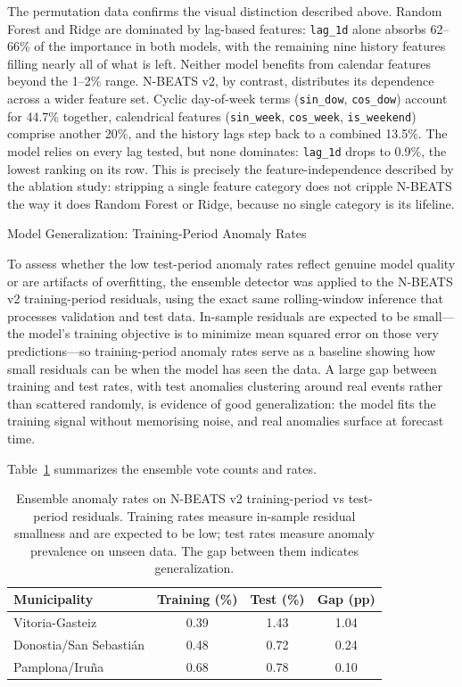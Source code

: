 ﻿\documentclass[12pt,reqno, twoside]{amsbook}
\makeatletter
\numberwithin{figure}{chapter}
\numberwithin{table}{chapter}
\numberwithin{equation}{chapter}
\def\subsection{\@startsection{subsection}{2}%
      \z@{.5\linespacing\@plus.7\linespacing}{.25\linespacing}%
      {\normalfont\bfseries\flushleft}}
\theoremstyle{plain}
\numberwithin{equation}{chapter}
\numberwithin{section}{chapter}
\makeatother
\begin{document}
The permutation data confirms the visual distinction described above. Random Forest and Ridge are dominated by lag-based features: \texttt{lag\_1d} alone absorbs 62--66\% of the importance in both models, with the remaining nine history features filling nearly all of what is left. Neither model benefits from calendar features beyond the 1--2\% range. N-BEATS v2, by contrast, distributes its dependence across a wider feature set. Cyclic day-of-week terms (\texttt{sin\_dow}, \texttt{cos\_dow}) account for 44.7\% together, calendrical features (\texttt{sin\_week}, \texttt{cos\_week}, \texttt{is\_weekend}) comprise another 20\%, and the history lags step back to a combined 13.5\%. The model relies on every lag tested, but none dominates: \texttt{lag\_1d} drops to 0.9\%, the lowest ranking on its row. This is precisely the feature-independence described by the ablation study: stripping a single feature category does not cripple N-BEATS the way it does Random Forest or Ridge, because no single category is its lifeline.

\subsection{Model Generalization: Training-Period Anomaly Rates}

To assess whether the low test-period anomaly rates reflect genuine model quality or are artifacts of overfitting, the ensemble detector was applied to the N-BEATS v2 training-period residuals, using the exact same rolling-window inference that processes validation and test data. In-sample residuals are expected to be small---the model's training objective is to minimize mean squared error on those very predictions---so training-period anomaly rates serve as a baseline showing how small residuals can be when the model has seen the data. A large gap between training and test rates, with test anomalies clustering around real events rather than scattered randomly, is evidence of good generalization: the model fits the training signal without memorising noise, and real anomalies surface at forecast time.

Table~\ref{tab:train_vs_test_anomaly} summarizes the ensemble vote counts and rates.

\begin{table}[htbp]
\centering
\caption{Ensemble anomaly rates on N-BEATS v2 training-period vs test-period residuals. Training rates measure in-sample residual smallness and are expected to be low; test rates measure anomaly prevalence on unseen data. The gap between them indicates generalization.}
\label{tab:train_vs_test_anomaly}
\begin{tabular}{lccc}
\toprule
\textbf{Municipality} & \textbf{Training (\%)} & \textbf{Test (\%)} & \textbf{Gap (pp)} \\
\midrule
Vitoria-Gasteiz      & 0.39 & 1.43 & 1.04 \\
Donostia/San Sebastián & 0.48 & 0.72 & 0.24 \\
Pamplona/Iruña       & 0.68 & 0.78 & 0.10 \\
\bottomrule
\end{tabular}
\end{table}
\end{document}
